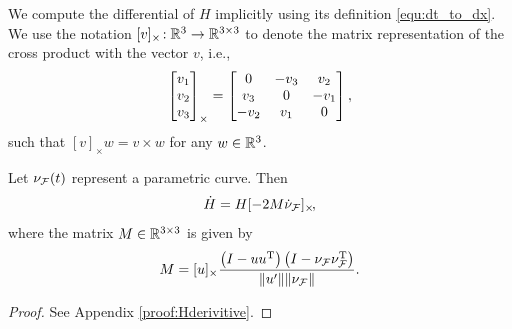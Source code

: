 \documentclass[10pt,twocolumn,twoside]{IEEEtran}
\begin{document}
  We compute the differential of $H$ implicitly using its definition \eqref{equ:dt_to_dx}. We use the notation $[v]_{\times}\!:\mathbb{R}^{3}{}\to\mathbb{R}^{3\times 3}{}$ to denote the matrix representation of the cross product with the vector $v$, i.e.,
  \begin{equation}
    \begin{bmatrix}v_1\\v_2\\v_3\end{bmatrix}_\times= \begin{bmatrix}0 & -v_3 &v_2\\v_3 & 0 & -v_1\\-v_2 & v_1 & 0\end{bmatrix},
  \end{equation}
  such that $[v]_\times w=v\times w$ for any $w\in\mathbb{R}^{3}{}$. %
  \begin{proposition}\label{prop:Hderivitive}
    Let $\nu_{\mathcal{F}}(t)$ represent a parametric curve. Then
    \begin{equation}
      \dot{H}=H[-2M\dot{\nu}_{\mathcal{F}}]_{\times}\!,
    \end{equation}
    where the matrix $M\in\mathbb{R}^{3\times3}{}$ is given by
    \begin{equation}
      M=[u]_{\times}  \frac{ \left( I - u u^\mathrm{T} \right) \left( I- \nu_{\mathcal{F}} \nu_{\mathcal{F}}^\mathrm{T} \right)} {\lVert u'\rVert \lVert\nu_{\mathcal{F}}\rVert}.
    \end{equation}
  \end{proposition}
  \begin{proof}
  	See Appendix \ref{proof:Hderivitive}.
  \end{proof}
\end{document}
